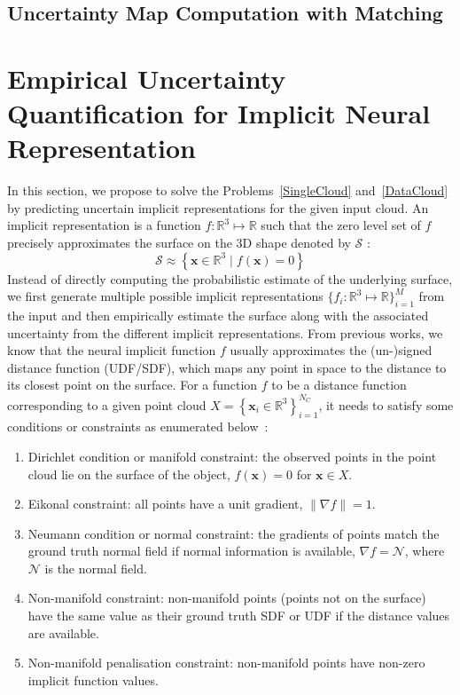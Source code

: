     \subsection{Uncertainty Map Computation with Matching}



\section{Empirical Uncertainty Quantification for Implicit Neural Representation}
In this section, we propose to solve the Problems~\ref{SingleCloud} and~\ref{DataCloud} by predicting uncertain implicit representations for the given input cloud. An implicit representation is a function $f: \mathbb{R}^{3} \mapsto \mathbb{R}$ such that the zero level set of $f$ precisely approximates the surface on the 3D shape denoted by $\mathcal{S}$ :
\begin{equation}
\mathcal{S} \approx \left\{\mathbf{x} \in \mathbb{R}^{3} \mid f(\mathbf{x})=0\right\}
\end{equation} 
Instead of directly computing the probabilistic estimate of the underlying surface, we first generate multiple possible implicit representations $\{f_i: \mathbb{R}^3 \mapsto \mathbb{R}\}_{i=1}^M$ from the input and then empirically estimate the surface along with the associated uncertainty from the different implicit representations. From previous works, we know that the neural implicit function $f$ usually approximates the (un-)signed distance function (UDF/SDF), which maps any point in space to the distance to its closest point on the surface. For a function $f$ to be a distance function corresponding to a given point cloud $X=\left\{\mathbf{x}_{i} \in \mathbb{R}^{3}\right\}_{i=1}^{N_C}$, it needs to satisfy some conditions or constraints as enumerated below~\cite{DiGS, NeuralHessian}:
\begin{enumerate}
    \item Dirichlet condition or manifold constraint: the observed points in the point cloud lie on the surface of the object, $f(\mathbf{x})=0$ for $\mathbf{x} \in X$.
    \item Eikonal constraint: all points have a unit gradient, $\|\nabla f\|=1$.
    \item Neumann condition or normal constraint:  the gradients of points match the ground truth normal field if normal information is available, $\nabla f=\mathcal{N}$, where $\mathcal{N}$ is the normal field.
    \item Non-manifold constraint: non-manifold points (points not on the surface) have the same value as their ground truth SDF or UDF if the distance values are available.
    \item Non-manifold penalisation constraint: non-manifold points have non-zero implicit function values.
\end{enumerate}

